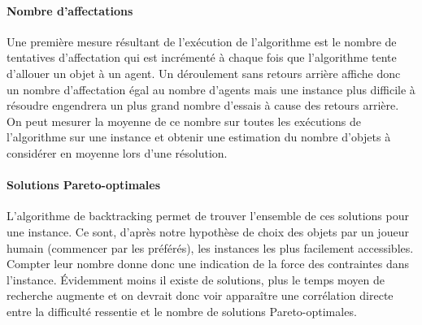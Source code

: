 \documentclass[a4paper, 11pt]{article}
\begin{document}
	\paragraph{Nombre d'affectations}{Une première mesure résultant de l'exécution de l'algorithme est le nombre de tentatives d'affectation qui est incrémenté à chaque fois que l'algorithme tente d'allouer un objet à un agent. Un déroulement sans retours arrière affiche donc un nombre d'affectation égal au nombre d'agents mais une instance plus difficile à résoudre engendrera un plus grand nombre d'essais à cause des retours arrière. On peut mesurer la moyenne de ce nombre sur toutes les exécutions de l'algorithme sur une instance et obtenir une estimation du nombre d'objets à considérer en moyenne lors d'une résolution.}
	
	\paragraph{Solutions Pareto-optimales}{L'algorithme de backtracking permet de trouver l'ensemble de ces solutions pour une instance. Ce sont, d'après notre hypothèse de choix des objets par un joueur humain (commencer par les préférés), les instances les plus facilement accessibles. Compter leur nombre donne donc une indication de la force des contraintes dans l'instance. Évidemment moins il existe de solutions, plus le temps moyen de recherche augmente et on devrait donc voir apparaître une corrélation directe entre la difficulté ressentie et le nombre de solutions Pareto-optimales.}
	
\end{document}
